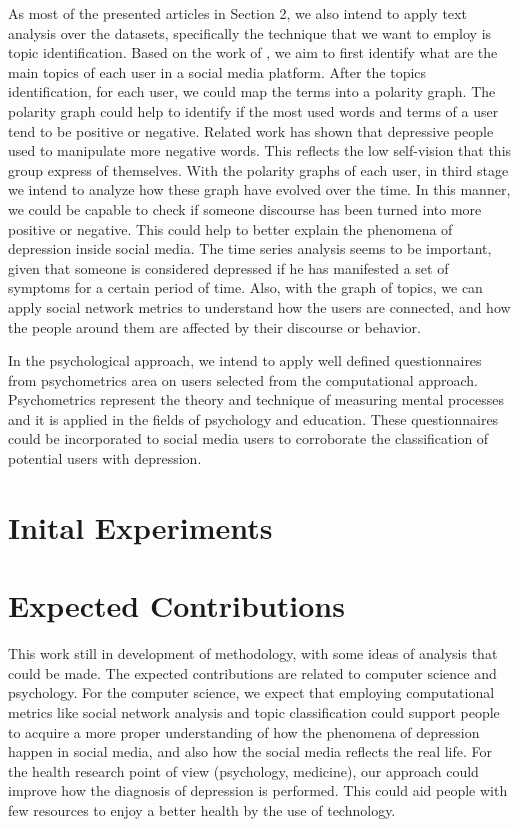 \documentclass[sigconf]{acmart}
\begin{document}
As most of the presented articles in Section 2, we also intend to apply text analysis over the datasets, specifically the technique that we want to employ is topic identification. Based on the work of \cite{Nolasco2016}, we aim to first identify what are the main topics of each user in a social media platform.
After the topics identification, for each user, we could map the terms into a polarity graph.
The polarity graph could help to identify if the most used words and terms of a user tend to be positive or negative. Related work has shown that depressive people used to manipulate more negative words. This reflects the low self-vision that this group express of themselves.
With the polarity graphs of each user, in third stage we intend to analyze how these graph have evolved over the time. In this manner, we could be capable to check if someone discourse has been turned into more positive or negative.
This could help to better explain the phenomena of depression inside social media. The time series analysis seems to be important, given that someone is considered depressed if he has manifested a set of symptoms for a certain period of time.
Also, with the graph of topics, we can apply social network metrics to understand how the users are connected, and how the people around them are affected by their discourse or behavior.

In the psychological approach, we intend to apply well defined questionnaires from psychometrics area on users selected from the computational approach.
Psychometrics represent the theory and technique of measuring mental processes and it is applied in the fields of psychology and education. These questionnaires could be incorporated to social media users to corroborate the classification of potential users with depression.

\section{Inital Experiments}\label{sec:experiments}

\section{Expected Contributions}\label{sec:expect_contribution}

This work still in development of methodology, with some ideas of analysis that could be made.
The expected contributions are related to computer science and psychology.
For the computer science, we expect that employing computational metrics like social network analysis and topic classification could support people to acquire a more proper understanding of how the phenomena of depression happen in social media, and also how the social media reflects the real life.
For the health research point of view (psychology, medicine), our approach could improve how the diagnosis of depression is performed. This could aid people with few resources to enjoy a better health by the use of technology.
\end{document}
